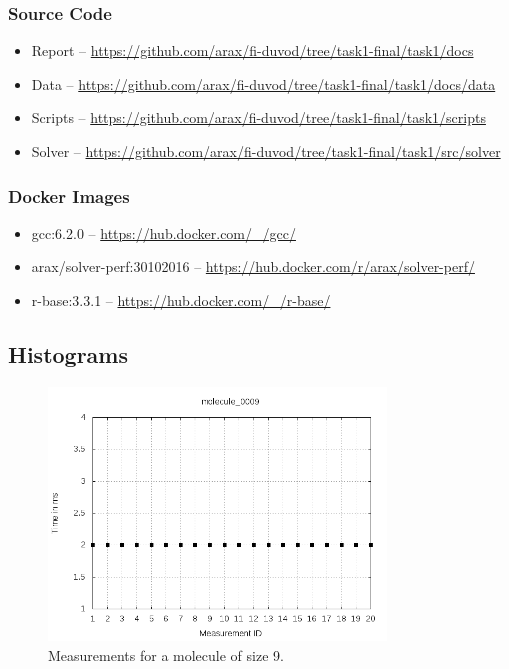 \documentclass[a4paper,12pt]{article}
\begin{document}
\subsubsection{Source Code}
\begin{itemize}
    \item Report -- \url{https://github.com/arax/fi-duvod/tree/task1-final/task1/docs}
    \item Data -- \url{https://github.com/arax/fi-duvod/tree/task1-final/task1/docs/data}
    \item Scripts -- \url{https://github.com/arax/fi-duvod/tree/task1-final/task1/scripts}
    \item Solver -- \url{https://github.com/arax/fi-duvod/tree/task1-final/task1/src/solver}
\end{itemize}

\subsubsection{Docker Images}
\begin{itemize}
    \item gcc:6.2.0 -- \url{https://hub.docker.com/_/gcc/}
    \item arax/solver-perf:30102016 -- \url{https://hub.docker.com/r/arax/solver-perf/}
    \item r-base:3.3.1 -- \url{https://hub.docker.com/_/r-base/}
\end{itemize}

\pagebreak

\subsection{Histograms}

\begin{figure}[!h]
  \centering
    \includegraphics[width=0.8\textwidth]{images/solver-perf-molecule_0009.png}
  \caption{Measurements for a molecule of size 9.}
\end{figure}
\end{document}
